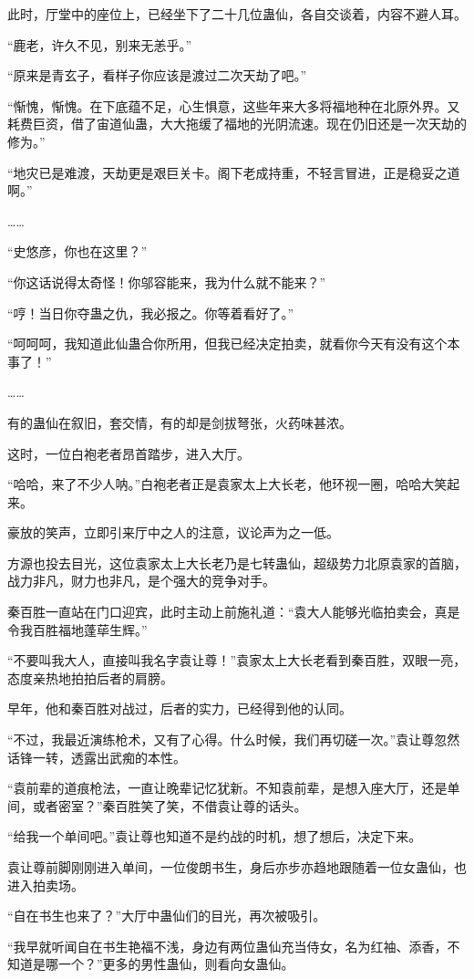 \begin{this_body}
此时，厅堂中的座位上，已经坐下了二十几位蛊仙，各自交谈着，内容不避人耳。

“鹿老，许久不见，别来无恙乎。”

“原来是青玄子，看样子你应该是渡过二次天劫了吧。”

“惭愧，惭愧。在下底蕴不足，心生惧意，这些年来大多将福地种在北原外界。又耗费巨资，借了宙道仙蛊，大大拖缓了福地的光阴流速。现在仍旧还是一次天劫的修为。”

“地灾已是难渡，天劫更是艰巨关卡。阁下老成持重，不轻言冒进，正是稳妥之道啊。”

……

“史悠彦，你也在这里？”

“你这话说得太奇怪！你邬容能来，我为什么就不能来？”

“哼！当日你夺蛊之仇，我必报之。你等着看好了。”

“呵呵呵，我知道此仙蛊合你所用，但我已经决定拍卖，就看你今天有没有这个本事了！”

……

有的蛊仙在叙旧，套交情，有的却是剑拔弩张，火药味甚浓。

这时，一位白袍老者昂首踏步，进入大厅。

“哈哈，来了不少人呐。”白袍老者正是袁家太上大长老，他环视一圈，哈哈大笑起来。

豪放的笑声，立即引来厅中之人的注意，议论声为之一低。

方源也投去目光，这位袁家太上大长老乃是七转蛊仙，超级势力北原袁家的首脑，战力非凡，财力也非凡，是个强大的竞争对手。

秦百胜一直站在门口迎宾，此时主动上前施礼道：“袁大人能够光临拍卖会，真是令我百胜福地蓬荜生辉。”

“不要叫我大人，直接叫我名字袁让尊！”袁家太上大长老看到秦百胜，双眼一亮，态度亲热地拍拍后者的肩膀。

早年，他和秦百胜对战过，后者的实力，已经得到他的认同。

“不过，我最近演练枪术，又有了心得。什么时候，我们再切磋一次。”袁让尊忽然话锋一转，透露出武痴的本性。

“袁前辈的道痕枪法，一直让晚辈记忆犹新。不知袁前辈，是想入座大厅，还是单间，或者密室？”秦百胜笑了笑，不借袁让尊的话头。

“给我一个单间吧。”袁让尊也知道不是约战的时机，想了想后，决定下来。

袁让尊前脚刚刚进入单间，一位俊朗书生，身后亦步亦趋地跟随着一位女蛊仙，也进入拍卖场。

“自在书生也来了？”大厅中蛊仙们的目光，再次被吸引。

“我早就听闻自在书生艳福不浅，身边有两位蛊仙充当侍女，名为红袖、添香，不知道是哪一个？”更多的男性蛊仙，则看向女蛊仙。


\end{this_body}
